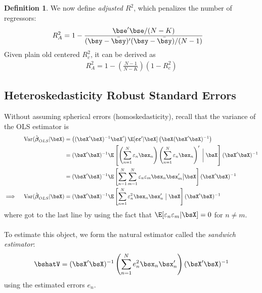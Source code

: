 \documentclass[12pt]{article}
\theoremstyle{plain}
\theoremstyle{definition}
\newtheorem{defn}[thm]{Definition}
\theoremstyle{remark}
\newcommand{\bsvarepsilon}{\boldsymbol{\varepsilon}}
\newcommand{\bsbeta}{\boldsymbol{\beta}}
\newcommand{\Var}{\operatorname{Var}}
\newcommand{\sumnN}{\sum^N_{n=1}}
\begin{document}
\begin{defn}
We now define \emph{adjusted $R^2$}, which penalizes the number of
regressors:
\begin{align*}
  R^2_A
  &= 1 -
  \frac{\bse'\bse/(N-K)}{(\bsy-\bar{\bsy})'(\bsy-\bar{\bsy})/(N-1)}
\end{align*}
Given plain old centered $R^2_c$, it can be derived as
\begin{align*}
  R^2_A =
  1 -
  \left(\frac{N-1}{N-K}\right)
  \left(1 - R^2_c\right)
\end{align*}
\end{defn}

\clearpage
\subsection{Heteroskedasticity Robust Standard Errors}

Without assuming spherical errors (homoskedasticity), recall that
the variance of the OLS estimator is
\begin{align*}
  \Var(\hat{\bsbeta}_{OLS}|\bsX)
  &=
  \left((\bsX'\bsX)^{-1}\bsX'\right)
  \E[\bsvarepsilon\bsvarepsilon' |\bsX]
  \left(\bsX(\bsX'\bsX)^{-1}\right) \\
  &=
  (\bsX'\bsX)^{-1}
  \E\left[
  \left(
  \sumnN \varepsilon_n \bsx_n
  \right)
  \left(
  \sumnN \varepsilon_n \bsx_n
  \right)'
  \;\bigg|\;\bsX
  \right]
  (\bsX'\bsX)^{-1} \\
  &=
  (\bsX'\bsX)^{-1}
  \E\left[
  \sumnN
  \sum_{m=1}^N
  \varepsilon_n\varepsilon_m \bsx_n\bsx_m'
  \big|\bsX
  \right]
  (\bsX'\bsX)^{-1} \\
  \implies\quad
  \Var(\hat{\bsbeta}_{OLS}|\bsX)
  &=
  (\bsX'\bsX)^{-1}
  \E\left[
  \sumnN
  \varepsilon_n^2 \bsx_n\bsx_n'
  \;\big|\;\bsX
  \right]
  (\bsX'\bsX)^{-1}
\end{align*}
where got to the last line by using the fact that
$\E[\varepsilon_n\varepsilon_m|\bsX]=0$ for $n\neq m$.
\\
\\
To estimate this object, we form the natural estimator called the
\emph{sandwich estimator}:
\begin{align*}
  \bshatV
  =
  (\bsX'\bsX)^{-1}
  \left(
  \sumnN
  e_n^2 \bsx_n\bsx_n'
  \right)
  (\bsX'\bsX)^{-1}
\end{align*}
using the estimated errors $e_n$.
\end{document}
